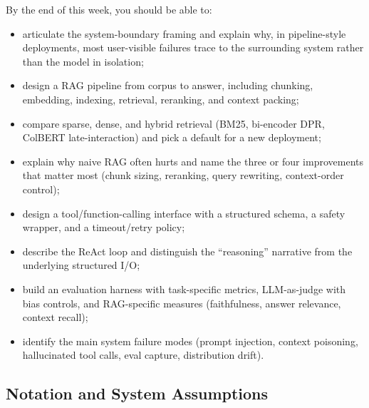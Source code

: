 By the end of this week, you should be able to:
\begin{itemize}
  \item articulate the system-boundary framing and explain why,
        in pipeline-style deployments, most user-visible failures
        trace to the surrounding system rather than the model in
        isolation;
  \item design a RAG pipeline from corpus to answer, including
        chunking, embedding, indexing, retrieval, reranking, and
        context packing;
  \item compare sparse, dense, and hybrid retrieval (BM25,
        bi-encoder DPR, ColBERT late-interaction) and pick a
        default for a new deployment;
  \item explain why naive RAG often hurts and name the three or
        four improvements that matter most (chunk sizing,
        reranking, query rewriting, context-order control);
  \item design a tool/function-calling interface with a structured
        schema, a safety wrapper, and a timeout/retry policy;
  \item describe the ReAct loop and distinguish the ``reasoning''
        narrative from the underlying structured I/O;
  \item build an evaluation harness with task-specific metrics,
        LLM-as-judge with bias controls, and RAG-specific measures
        (faithfulness, answer relevance, context recall);
  \item identify the main system failure modes (prompt injection,
        context poisoning, hallucinated tool calls, eval capture,
        distribution drift).
\end{itemize}

\subsection{Notation and System Assumptions}

